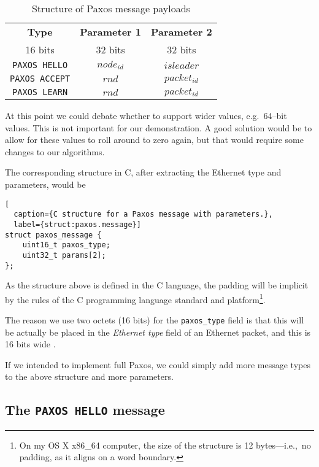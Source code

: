 \begin{table}[H]
  \centering
  \begin{tabular}{|c|c|c|}
    \hline \textbf{Type} & \textbf{Parameter 1} & \textbf{Parameter 2} \\
           16 bits & 32 bits & 32 bits \\
    \hline \texttt{PAXOS HELLO} & $node_{id}$ & $isleader$ \\
    \hline \texttt{PAXOS ACCEPT} & $rnd$ & $packet_{id}$ \\
    \hline \texttt{PAXOS LEARN} & $rnd$ & $packet_{id}$ \\
    \hline
  \end{tabular}
  \caption{Structure of Paxos message payloads}
  \label{table:paxos.payload.structure}
\end{table}

At this point we
could debate whether to support wider values, e.g.~64--bit values.
This is not important for our demonstration.  A good solution would be to
allow for these values to roll around to zero again, but that would require
some changes to our algorithms.

The corresponding structure in C, after extracting the Ethernet type and
parameters, would be

\begin{lstlisting}[
  caption={C structure for a Paxos message with parameters.},
  label={struct:paxos.message}]
struct paxos_message {
    uint16_t paxos_type;
    uint32_t params[2];
};
\end{lstlisting}

As the structure above is defined in the C language, the padding will be
implicit by the rules of the C programming language standard and
platform\footnote{On my OS X x86\_{}64 computer, the size of the structure
is 12 bytes---i.e.,~no padding, as it aligns on a word boundary.}.

The reason we use two octets (16 bits) for the \texttt{paxos\_{}type} field
is that this will be actually be placed in the \textit{Ethernet type} field
of an Ethernet packet, and this is 16 bits wide \cite{IEEE.802.3}.

If we intended to implement full Paxos, we could simply add more message
types to the above structure and more parameters.

\subsection{The \texttt{PAXOS HELLO} message}

